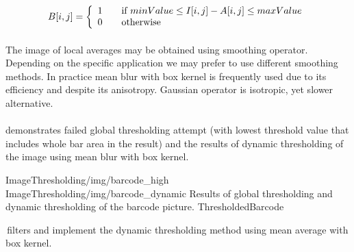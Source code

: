 \[
B[i,j] = \left\{ 
  \begin{array}{l l}
    1 & \quad \text{if } minValue \leq I[i,j] - A[i,j] \leq maxValue \\
    0 & \quad \text{otherwise} \\
  \end{array} \right.
\]

\paragraph*{}
The image of local averages may be obtained using smoothing operator. Depending on the specific application we may prefer to use different smoothing methods. In practice mean blur with box kernel is frequently used due to its efficiency and despite its anisotropy. Gaussian operator is isotropic, yet slower alternative. 

\paragraph*{}
 demonstrates failed global thresholding attempt (with lowest threshold value that includes whole bar area in the result) and the results of dynamic thresholding of the image using mean blur with box kernel.

\twoFigures
{ImageThresholding/img/barcode_high}
{ImageThresholding/img/barcode_dynamic}
{Results of global thresholding and dynamic thresholding of the barcode picture.}
{ThresholdedBarcode}
{\basicWidth}

\begin{refImpl}
\studio \,filters  and  implement the dynamic thresholding method using mean average with box kernel. 
\end{refImpl}
